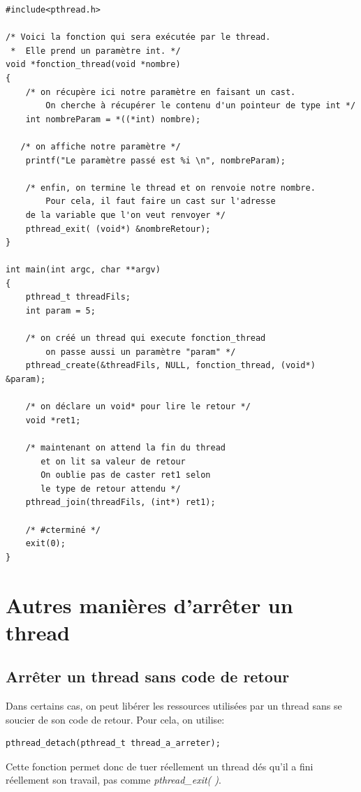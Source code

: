 \documentclass{report}
\begin{document}
\begin{lstlisting}
#include<pthread.h>

/* Voici la fonction qui sera exécutée par le thread. 
 *  Elle prend un paramètre int. */
void *fonction_thread(void *nombre)
{
    /* on récupère ici notre paramètre en faisant un cast.
        On cherche à récupérer le contenu d'un pointeur de type int */
    int nombreParam = *((*int) nombre);

   /* on affiche notre paramètre */
    printf("Le paramètre passé est %i \n", nombreParam);
    
    /* enfin, on termine le thread et on renvoie notre nombre.
    	Pour cela, il faut faire un cast sur l'adresse
	de la variable que l'on veut renvoyer */
    pthread_exit( (void*) &nombreRetour); 
}

int main(int argc, char **argv)
{
	pthread_t threadFils;
	int param = 5;
	
	/* on créé un thread qui execute fonction_thread 
	    on passe aussi un paramètre "param" */
	pthread_create(&threadFils, NULL, fonction_thread, (void*) &param); 

	/* on déclare un void* pour lire le retour */
	void *ret1;
	
	/* maintenant on attend la fin du thread
	   et on lit sa valeur de retour
	   On oublie pas de caster ret1 selon
	   le type de retour attendu */
	pthread_join(threadFils, (int*) ret1); 
	
	/* #cterminé */
	exit(0);
}
\end{lstlisting}	

\section{Autres manières d'arrêter un thread}

\subsection{Arrêter un thread sans code de retour}
Dans certains cas, on peut libérer les ressources utilisées par un thread sans se soucier de son code de retour. Pour cela, on utilise:
\begin{verbatim}
pthread_detach(pthread_t thread_a_arreter);
\end{verbatim}
Cette fonction permet donc de tuer réellement un thread dés qu'il a fini réellement son travail, pas comme \emph{pthread\_exit( )}.
\end{document}
